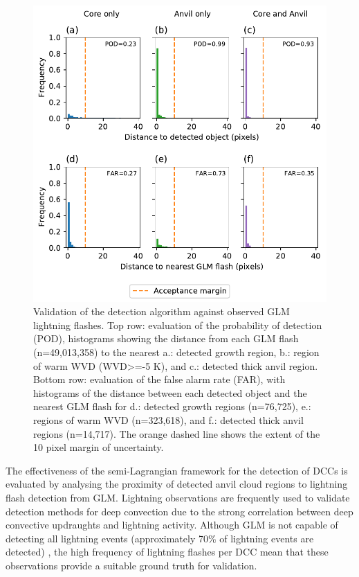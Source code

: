 \documentclass[amt, manuscript]{copernicus}
\begin{document}
\begin{figure}[t]
    \includegraphics[width=12cm]{figure09.pdf}
    \caption{Validation of the detection algorithm against observed GLM lightning flashes. Top row: evaluation of the probability of detection (POD), histograms showing the distance from each GLM flash (n=49,013,358) to the nearest a.: detected growth region, b.: region of warm WVD (WVD>=-5 \unit{K}), and c.: detected thick anvil region. Bottom row: evaluation of the false alarm rate (FAR), with histograms of the distance between each detected object and the nearest GLM flash for d.: detected growth regions (n=76,725), e.: regions of warm WVD (n=323,618), and f.: detected thick anvil regions (n=14,717). The orange dashed line shows the extent of the 10 pixel margin of uncertainty.}
    \label{fig:validation}
\end{figure}

The effectiveness of the semi-Lagrangian framework for the detection of DCCs is evaluated by analysing the proximity of detected anvil cloud regions to lightning flash detection from GLM.
Lightning observations are frequently used to validate detection methods for deep convection \citep[e.g.,][]{zinner_validation_2013, muller_novel_2019} due to the strong correlation between deep convective updraughts and lightning activity.
Although GLM is not capable of detecting all lightning events (approximately 70\% of lightning events are detected) \citep{peterson_removing_2020}, the high frequency of lightning flashes per DCC mean that these observations provide a suitable ground truth for validation. 
\end{document}
